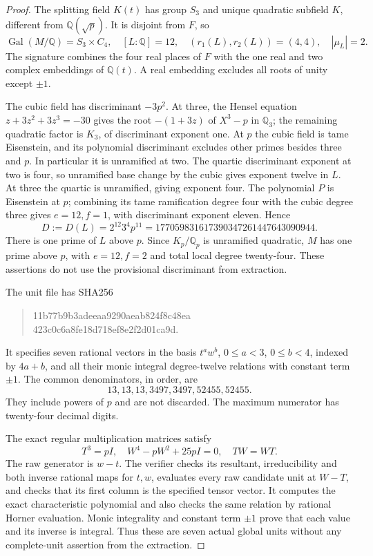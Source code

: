 \begin{proof}
The splitting field $K(t)$ has group $S_3$ and unique quadratic
subfield $K$, different from $\mathbb Q(\sqrt p)$.
It is disjoint from $F$, so
\[
 \operatorname{Gal}(M/\mathbb Q)=S_3\times C_4,
 \quad [L:\mathbb Q]=12,
 \quad(r_1(L),r_2(L))=(4,4),\quad |\mu_L|=2.
 \tag{G152C.8}
\]
The signature combines the four real places of $F$ with
the one real and two complex embeddings of $\mathbb Q(t)$.
A real embedding excludes all roots of unity except $\pm1$.

The cubic field has discriminant $-3p^2$.
At three, the Hensel equation $z+3z^2+3z^3=-30$
gives the root $-(1+3z)$ of $X^3-p$ in $\mathbb Q_3$;
the remaining quadratic factor is $K_3$, of discriminant exponent one.
At $p$ the cubic field is tame Eisenstein, and its polynomial
discriminant excludes other primes besides three and $p$.
In particular it is unramified at two.
The quartic discriminant exponent at two is four, so unramified
base change by the cubic gives exponent twelve in $L$.
At three the quartic is unramified, giving exponent four.
The polynomial $P$ is Eisenstein at $p$; combining its tame
ramification degree four with the cubic degree three gives
$e=12,f=1$, with discriminant exponent eleven.
Hence
\[
 D:=D(L)=2^{12}3^4p^{11}
       =177059831617390347261447643090944.
 \tag{G152C.9}
\]
There is one prime of $L$ above $p$.
Since $K_p/\mathbb Q_p$ is unramified quadratic, $M$ has
one prime above $p$, with $e=12,f=2$ and total local degree twenty-four.
These assertions do not use the provisional discriminant from extraction.

The unit file
has SHA256
\begin{quote}\ttfamily\small
11b77b9b3adeeaa9290aeab824f8c48ea\\
423c0c6a8fe18d718ef8e2f2d01ca9d.
\end{quote}
It specifies seven rational vectors in the basis $t^a w^b$,
$0\le a<3$, $0\le b<4$, indexed by $4a+b$, and all their
monic integral degree-twelve relations with constant term $\pm1$.
The common denominators, in order, are
\[
                         13,13,13,3497,3497,52455,52455.
 \tag{G152C.10}
\]
They include powers of $p$ and are not discarded.
The maximum numerator has twenty-four decimal digits.

The exact regular multiplication matrices satisfy
\[
                     T^3=pI,\quad W^4-pW^2+25pI=0,
                     \quad TW=WT.
 \tag{G152C.11}
\]
The raw generator is $w-t$.
The verifier checks its resultant, irreducibility and both inverse
rational maps for $t,w$, evaluates every raw candidate unit at $W-T$,
and checks that its first column is the specified tensor vector.
It computes the exact characteristic polynomial and also checks
the same relation by rational Horner evaluation.
Monic integrality and constant term $\pm1$ prove that each value
and its inverse is integral.  Thus these are seven actual global
units without any complete-unit assertion from the extraction.


\end{proof}
